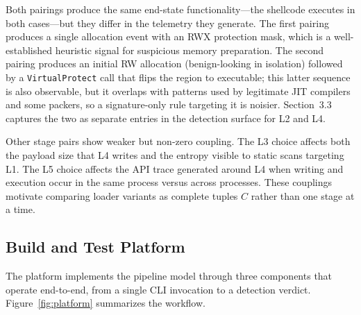 Both pairings produce the same end-state functionality---the shellcode executes in both cases---but they differ in the telemetry they generate.
The first pairing produces a single allocation event with an RWX protection mask, which is a well-established heuristic signal for suspicious memory preparation.
The second pairing produces an initial RW allocation (benign-looking in isolation) followed by a \texttt{VirtualProtect} call that flips the region to executable; this latter sequence is also observable, but it overlaps with patterns used by legitimate JIT compilers and some packers, so a signature-only rule targeting it is noisier.
Section~3.3 captures the two as separate entries in the detection surface for L2 and L4.

Other stage pairs show weaker but non-zero coupling.
The L3 choice affects both the payload size that L4 writes and the entropy visible to static scans targeting L1.
The L5 choice affects the API trace generated around L4 when writing and execution occur in the same process versus across processes.
These couplings motivate comparing loader variants as complete tuples $C$ rather than one stage at a time.

\subsection{Build and Test Platform}

The platform implements the pipeline model through three components that operate end-to-end, from a single CLI invocation to a detection verdict.
Figure~\ref{fig:platform} summarizes the workflow.

